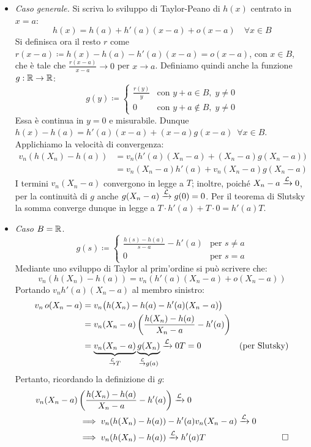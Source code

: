 \begin{dimo}
	\Fixvmode
	\begin{itemize}
		\item \emph{Caso generale.}
		Si scriva lo sviluppo di Taylor-Peano di $h(x)$ centrato in $x = a$:
		$$h(x) = h(a) + h'(a) (x-a) + o(x-a) \quad \forall x \in B$$
		Si definisca ora il resto $r$ come $r(x-a) \coloneqq h(x) - h(a) - h'(a) (x-a) = o(x-a)$, con $x \in B$, che è tale che $\frac{r(x-a)}{x-a} \to 0$ per $x \to a$. Definiamo quindi anche la funzione $g: \mathbb R\to\mathbb R$:
		$$g(y) \coloneqq
		\begin{cases}
		\frac{r(y)} y & \text{con } y+a \in B, \; y \neq 0\\
		0       & \text{con } y+a \notin B, \; y \neq 0
		\end{cases}
		$$
		Essa è continua in $y = 0$ e misurabile. Dunque $h(x) - h(a) = h'(a) (x-a) + (x-a) g(x-a) \enspace \forall x \in B$. Applichiamo la velocità di convergenza:
		\begin{align*}
			v_n(h(X_n)-h(a)) &= v_n\big( h'(a) (X_n-a)  + (X_n-a) g(X_n-a) \big) \\
			&=v_n (X_n-a) h'(a) + v_n(X_n-a)g(X_n-a)
		\end{align*}
		I termini $v_n(X_n-a)$ convergono in legge a $T$; inoltre, poiché $X_n-a \xrightarrow{\mathcal L} 0$, per la continuità di $g$ anche $g(X_n-a) \xrightarrow{\mathcal L} g(0) = 0$. Per il teorema di Slutsky la somma converge dunque in legge a $T \cdot h'(a) + T \cdot 0 = h'(a) T$.
		\item \emph{Caso $B=\mathbb R$}.
		$$g(s) \coloneqq
		\begin{cases}
		\frac{h(s)-h(a)}{s-a}-h'(a) & \text{per } s\neq a\\
		0       & \text{per } s = a
		\end{cases}
		$$
		Mediante uno sviluppo di Taylor al prim'ordine si può scrivere che:
		$$v_n (h(X_n) - h(a)) = v_n ( h'(a) (X_n-a) + o(X_n-a) )$$
		Portando $v_n h'(a) (X_n-a)$ al membro sinistro:
		\begin{align*}
			v_n \, o(X_n-a)
			&= v_n \big( h(X_n)-h(a)-h'(a)(X_n-a) \big) \\
			&= v_n(X_n-a) \left( \frac{h(X_n)-h(a)}{X_n-a}-h'(a) \right) \\
			&= \underbrace{v_n(X_n-a)}_{\stackrel{\mathcal L}{\to}T}\underbrace{g(X_n)}_{\stackrel{\mathcal L}{\to}g(a)}
			\xrightarrow{\mathcal L} 0 T = 0 &\text{(per Slutsky)}
		\end{align*}
		Pertanto, ricordando la definizione di $g$:
		\begin{align*}		
		v_n (X_n - a) &\left(\frac{h(X_n)-h(a)}{X_n-a} - h'(a) \right) \xrightarrow{\mathcal L} 0 \\
		&\implies v_n (h(X_n)-h(a)) - h'(a) v_n (X_n-a) \xrightarrow{\mathcal L} 0 \\
		&\implies v_n (h(X_n)-h(a)) \xrightarrow{\mathcal L} h'(a) T &\qedhere
		\end{align*}
	\end{itemize}
\end{dimo}

